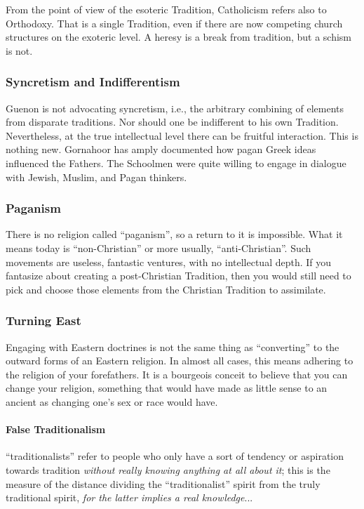 From the point of view of the esoteric Tradition, Catholicism refers also to Orthodoxy. That is a single Tradition, even if there are now competing church structures on the exoteric level. A heresy is a break from tradition, but a schism is not.

\subsubsection{Syncretism and Indifferentism}

Guenon is not advocating syncretism, i.e., the arbitrary combining of elements from disparate traditions. Nor should one be indifferent to his own Tradition. Nevertheless, at the true intellectual level there can be fruitful interaction. This is nothing new. Gornahoor has amply documented how pagan Greek ideas influenced the Fathers. The Schoolmen were quite willing to engage in dialogue with Jewish, Muslim, and Pagan thinkers.

\subsubsection{Paganism}


There is no religion called ``paganism'', so a return to it is impossible. What it means today is ``non-Christian'' or more usually, ``anti-Christian''. Such movements are useless, fantastic ventures, with no intellectual depth. If you fantasize about creating a post-Christian Tradition, then you would still need to pick and choose those elements from the Christian Tradition to assimilate.

\subsubsection{Turning East}


Engaging with Eastern doctrines is not the same thing as ``converting'' to the outward forms of an Eastern religion. In almost all cases, this means adhering to the religion of your forefathers. It is a bourgeois conceit to believe that you can change your religion, something that would have made as little sense to an ancient as changing one's sex or race would have.

\paragraph{False Traditionalism}


\begin{quotex} ``traditionalists'' refer to people who only have a sort of tendency or aspiration towards tradition \emph{without really knowing anything at all about it}; this is the measure of the distance dividing the ``traditionalist'' spirit from the truly traditional spirit, \emph{for the latter implies a real knowledge}... 
\end{quotex}


